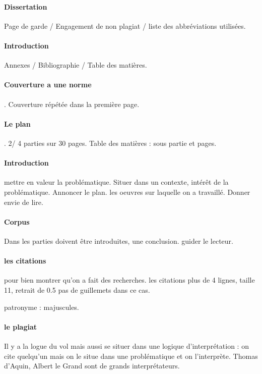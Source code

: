 \paragraph{Dissertation} Page de garde / Engagement de non plagiat / liste des abbréviations utilisées. 

\paragraph{Introduction} Annexes / Bibliographie / Table des matières. 

\paragraph{Couverture a une norme}. Couverture répétée dans la première page. 

\paragraph{Le plan}. 2/ 4 parties sur 30 pages. Table des matières : sous partie et pages.

\paragraph{Introduction} mettre en valeur la problématique. Situer dans un contexte, intérêt de la problématique. Annoncer le plan. les oeuvres sur laquelle on a travaillé. Donner envie de lire.

\paragraph{Corpus} Dans les parties doivent être introduites, une conclusion. guider le lecteur. 

\paragraph{les citations} pour bien montrer qu'on a fait des recherches. les citations plus de 4 lignes, taille 11, retrait de 0.5 pas de guillemets dans ce cas. 

patronyme : majuscules. 

\paragraph{le plagiat} Il y a la logue du vol mais aussi se situer dans une logique d'interprétation : on cite quelqu'un mais on le situe dans une problématique et on l'interprète.  Thomas d'Aquin, Albert le Grand sont de grands interprétateurs. 





 







